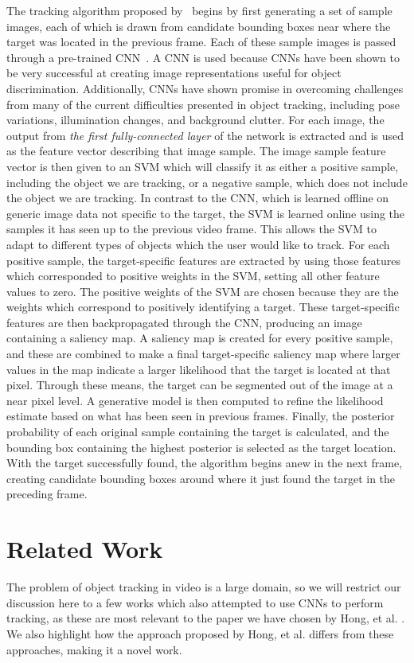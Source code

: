 \documentclass{sig-alternate-05-2015}
\begin{document}
The tracking algorithm proposed by~\cite{hong2015online} begins by first generating a set of sample images, each of which is drawn from candidate bounding boxes near where the target was located in the previous frame.
Each of these sample images is passed through a pre-trained CNN~\cite{jia2014caffe}.
A CNN is used because CNNs have been shown to be very successful at creating image representations useful for object discrimination.
Additionally, CNNs have shown promise in overcoming challenges from many of the current difficulties presented in object tracking, including pose variations, illumination changes, and background clutter.
For each image, the output from \textit{the first fully-connected layer} of the network is extracted and is used as the feature vector describing that image sample.
The image sample feature vector is then given to an SVM which will classify it as either a positive sample, including the object we are tracking, or a negative sample, which does not include the object we are tracking.
In contrast to the CNN, which is learned offline on generic image data not specific to the target, the SVM is learned online using the samples it has seen up to the previous video frame.
This allows the SVM to adapt to different types of objects which the user would like to track.
For each positive sample, the target-specific features are extracted by using those features which corresponded to positive weights in the SVM, setting all other feature values to zero.
The positive weights of the SVM are chosen because they are the weights which correspond to positively identifying a target.
These target-specific features are then backpropagated through the CNN, producing an image containing a saliency map.
A saliency map is created for every positive sample, and these are combined to make a final target-specific saliency map where larger values in the map indicate a larger likelihood that the target is located at that pixel.
Through these means, the target can be segmented out of the image at a near pixel level.
A generative model is then computed to refine the likelihood estimate based on what has been seen in previous frames.
Finally, the posterior probability of each original sample containing the target is calculated, and the bounding box containing the highest posterior is selected as the target location.
With the target successfully found, the algorithm begins anew in the next frame, creating candidate bounding boxes around where it just found the target in the preceding frame.

\section{Related Work}
The problem of object tracking in video is a large domain, so we will restrict our discussion here to a few works which also attempted to use CNNs to perform tracking, as these are most relevant to the paper we have chosen by Hong, et al. \cite{hong2015online}.
We also highlight how the approach proposed by Hong, et al. differs from these approaches, making it a novel work.
\end{document}
